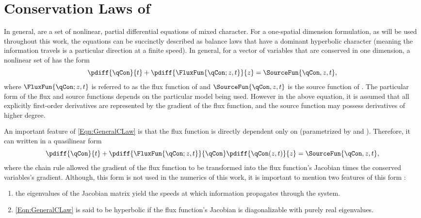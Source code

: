 \section{Conservation Laws of \THcc}
In general, \CLaws are a set of nonlinear, partial differential equations of mixed character.
For a one-spatial dimension formulation, as will be used throughout this work, the equations can be succinctly described as balance laws that have a dominant hyperbolic character (meaning the information travels is a particular direction at a finite speed).
In general, for a vector of variables \qCon that are conserved in one dimension, a nonlinear set of \CLaws has the form
\begin{equation}
    \pdiff{\qCon}{t} + \pdiff{\FluxFun{\qCon; z,t}}{z} = \SourceFun{\qCon,z,t},
\label{Eqn:GeneralCLaw}
\end{equation}
where $\FluxFun{\qCon;z,t}$ is referred to as the flux function of \qCon and $\SourceFun{\qCon,z,t}$ is the source function of \qCon.
The particular form of the flux and source functions depends on the particular model being used.
However in the above equation, it is assumed that all explicitly first-order derivatives are represented by the gradient of the flux function, and the source function may possess derivatives of higher degree.

An important feature of \cref{Eqn:GeneralCLaw} is that the flux function is directly dependent only on \qCon (parametrized by \Space and \Time).  Therefore, it can written in a quasilinear form
\begin{equation}
    \pdiff{\qCon}{t} + \pdiff{\FluxFun{\qCon;z,t}}{\qCon}\pdiff{\qCon(z,t)}{z} = \SourceFun{\qCon,z,t},
\label{Eqn:GeneralCLawQuasilinear}
\end{equation}
where the chain rule allowed the gradient of the flux function to be transformed into the flux function's Jacobian times the conserved variables's gradient.
Although, this form is not used in the numerics of this work, it is important to mention two features of this form \cite{leveque_finite_2002}:
\vspace*{-0.75em}
\begin{enumerate}
    \onehalfspacing
    \item{the eigenvalues of the Jacobian matrix yield the speeds at which information propagates through the system.}
    \item{\cref{Eqn:GeneralCLaw} is said to be hyperbolic if the flux function's Jacobian is diagonalizable with purely real eigenvalues.}
\end{enumerate}

